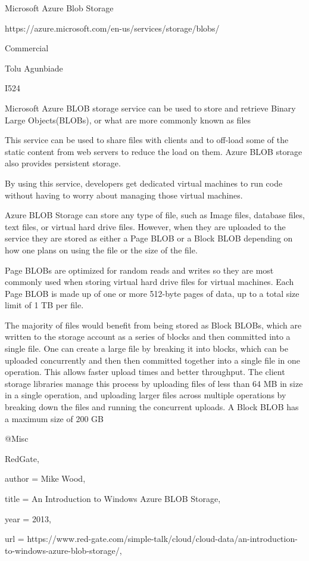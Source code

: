 Microsoft Azure Blob Storage

https://azure.microsoft.com/en-us/services/storage/blobs/

Commercial

Tolu Agunbiade

I524

Microsoft Azure BLOB storage service can be used to store and retrieve Binary Large Objects(BLOBs), or what are more commonly known as files\cite{hid-sp18-501-RedGate}

This service can be used to share files with clients and to off-load some of the static content from web servers to reduce the load on them. Azure BLOB storage also provides persistent storage. 

By using this service, developers get dedicated virtual machines to run code without having to worry about managing those virtual machines. 

Azure BLOB Storage can store any type of file, such as Image files, database files, text files, or virtual hard drive files. However, when they are uploaded to the service they are stored as either a Page BLOB or a Block BLOB depending on how one plans on using the file or the size of the file.

Page BLOBs are optimized for random reads and writes so they are most commonly used when storing virtual hard drive files for virtual machines. Each Page BLOB is made up of one or more 512-byte pages of data, up to a total size limit of 1 TB per file.

The majority of files would benefit from being stored as Block BLOBs, which are written to the storage account as a series of blocks and then committed into a single file. One can create a large file by breaking it into blocks, which can be uploaded concurrently and then then committed together into a single file in one operation. This allows faster upload times and better throughput. The client storage libraries manage this process by uploading files of less than 64 MB in size in a single operation, and uploading larger files across multiple operations by breaking down the files and running the concurrent uploads. A Block BLOB has a maximum size of 200 GB\cite{RedGate}

@Misc{RedGate,

  author = {Mike Wood},

  title  = {An Introduction to Windows Azure BLOB Storage},

  year   = {2013},

url = {https://www.red-gate.com/simple-talk/cloud/cloud-data/an-introduction-to-windows-azure-blob-storage/},

}
